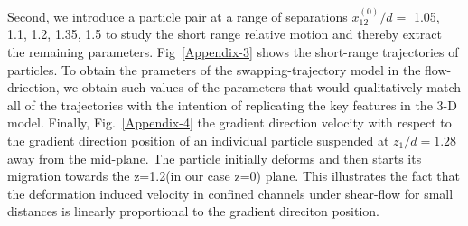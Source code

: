Second, we introduce a particle pair at a range of separations $x_{12}^{(0)}/d = $ 1.05, 1.1, 1.2, 1.35, 1.5 to study the short range relative motion and thereby extract the remaining parameters. Fig~\ref{Appendix-3} shows the short-range trajectories of particles. To obtain the prameters of the swapping-trajectory model in the flow-driection, we obtain such values of the parameters that would qualitatively match all of the trajectories with the intention of replicating the key features in the 3-D model.
Finally, Fig.~\ref{Appendix-4} the gradient direction velocity with respect to the gradient direction position of an individual particle suspended at $z_{1}/d = 1.28$ away from the mid-plane. The particle initially deforms and then starts its migration towards the z=1.2(in our case z=0) plane. This illustrates the fact that the deformation induced velocity in confined channels under shear-flow for small distances is linearly proportional to the gradient direciton position.
